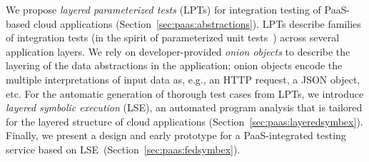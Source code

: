 We propose \textit{layered parameterized tests} (LPTs) for integration testing of PaaS-based cloud applications (Section~\ref{sec:paas:abstractions}). LPTs describe families of integration tests (in the spirit of parameterized unit tests~\cite{tillmann-puts}) across several application layers. We rely on developer-provided \textit{onion objects} to describe the layering of the data abstractions in the application; onion objects encode the multiple interpretations of input data as, e.g., an HTTP request, a JSON object, etc.
%
For the automatic generation of thorough test cases from LPTs, we introduce \emph{layered symbolic execution} (LSE), an automated program analysis that is tailored for the layered structure of cloud applications (Section~\ref{sec:paas:layeredsymbex}).
%
Finally, we present a design and early prototype for a PaaS-integrated testing service based on LSE~(Section~\ref{sec:paas:fedsymbex}).

